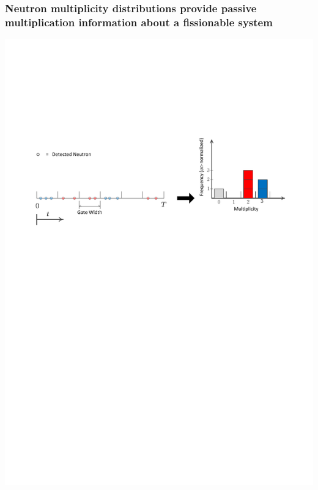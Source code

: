 \begin{frame}
\frametitle{Neutron multiplicity distributions provide passive \\ multiplication
information about a fissionable system}
 \centering
 \includegraphics[trim=0.7in 6.075in 0.6in 2.0in,clip,width=1.0\textwidth]{neutron_hist.pdf}

\end{frame}


